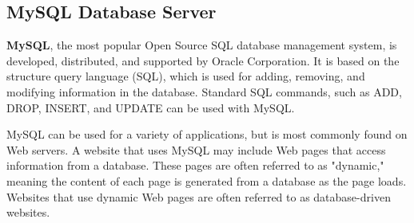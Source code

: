 \newpage

\subsection{MySQL Database Server}

{\bf MySQL}, the most popular Open Source SQL database management system, is
developed, distributed, and supported by Oracle Corporation. It is
based on the structure query language (SQL), which is used for adding,
removing, and modifying information in the database. Standard SQL
commands, such as ADD, DROP, INSERT, and UPDATE can be used with
MySQL.

MySQL can be used for a variety of applications, but is most commonly
found on Web servers. A website that uses MySQL may include Web pages
that access information from a database. These pages are often
referred to as "dynamic," meaning the content of each page is
generated from a database as the page loads. Websites that use dynamic
Web pages are often referred to as database-driven websites.

